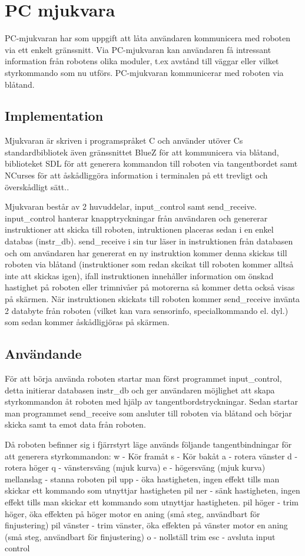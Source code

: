 \section{PC mjukvara}
PC-mjukvaran har som uppgift att låta användaren kommunicera med roboten via ett
enkelt gränssnitt. Via PC-mjukvaran kan användaren få intressant information
från robotens olika moduler, t.ex avstånd till väggar eller vilket styrkommando
som nu utförs. PC-mjukvaran kommunicerar med roboten via blåtand.

\subsection{Implementation}

Mjukvaran är skriven i programspråket C och använder utöver Cs standardbibliotek
även gränssnittet BlueZ för att kommunicera via blåtand, biblioteket SDL för att
generera kommandon till roboten via tangentbordet samt NCurses för att
åskådliggöra information i terminalen på ett trevligt och överskådligt sätt..

Mjukvaran består av 2 huvuddelar, input_control samt send_receive. input_control
hanterar knapptryckningar från användaren och genererar instruktioner att skicka
till roboten, intruktionen placeras sedan i en enkel databas (instr_db).
send_receive i sin tur läser in instruktionen från databasen och om användaren
har genererat en ny instruktion kommer denna skickas till roboten via blåtand
(instruktioner som redan skcikat till roboten kommer alltså inte att skickas
 igen), ifall instruktionen innehåller information om önskad hastighet på
roboten eller trimnivåer på motorerna så kommer detta också visas på skärmen.
När instruktionen skickats till roboten kommer send_receive invänta 2 databyte
från roboten (vilket kan vara sensorinfo, specialkommando el. dyl.) som sedan
kommer åskådligjöras på skärmen.
\subsection{Användande}

För att börja använda roboten startar man först programmet input_control, detta
initierar databasen instr_db och ger användaren möjlighet att skapa
styrkommandon åt roboten med hjälp av tangentbordstryckningar. Sedan startar man
programmet send_receive som ansluter till roboten via blåtand och börjar skicka
samt ta emot data från roboten.

Då roboten befinner sig i fjärrstyrt läge används följande tangentbindningar för
att generera styrkommandon:
w - Kör framåt
s - Kör bakåt
a - rotera vänster
d - rotera höger
q - vänstersväng (mjuk kurva)
e - högersväng (mjuk kurva)
mellanslag - stanna roboten
pil upp - öka hastigheten, ingen effekt tills man skickar ett kommando som
utnyttjar hastigheten
pil ner - sänk hastigheten, ingen effekt tills man skickar ett kommando som
utnyttjar hastigheten.
pil höger - trim höger, öka effekten på höger motor en aning (små steg,
		användbart för finjustering)
pil vänster - trim vänster, öka effekten på vänster motor en aning (små steg,
		användbart för finjustering)
o - nollställ trim
esc - avsluta input control

